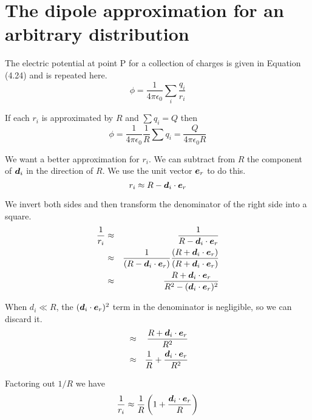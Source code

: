 \section{The dipole approximation for an arbitrary distribution}

The electric potential at point P for a collection of charges
is given in Equation (4.24) and is repeated here.
\begin{equation}
  \phi = \frac{1}{4\pi\epsilon_0} \sum_i \frac{q_i}{r_i}
\end{equation}

If each $r_i$ is approximated by $R$ and $\sum q_i=Q$ then
\begin{equation}
  \phi = \frac{1}{4\pi\epsilon_0} \frac{1}{R} \sum q_i = \frac{Q}{4\pi\epsilon_0 R}
\end{equation}

We want a better approximation for $r_i$.
We can subtract from $R$ the component of $\boldsymbol{d}_i$ in the direction of $R$.
We use the unit vector $\boldsymbol{e}_r$ to do this.
\begin{equation}
  r_i \approx R - \boldsymbol{d}_i \cdot \boldsymbol{e}_r
\end{equation}

We invert both sides and then transform the denominator
of the right side into a square.
\begin{eqnarray*}
  \frac{1}{r_i}
  &\approx& \frac{1}{R - \boldsymbol{d}_i \cdot \boldsymbol{e}_r} \\
  &\approx& \frac{1}{(R - \boldsymbol{d}_i \cdot \boldsymbol{e}_r)}
    \frac{(R + \boldsymbol{d}_i \cdot \boldsymbol{e}_r)}
	 {(R + \boldsymbol{d}_i \cdot \boldsymbol{e}_r)} \\
  &\approx& \frac{R + \boldsymbol{d}_i \cdot \boldsymbol{e}_r}
    {R^2 - (\boldsymbol{d}_i \cdot \boldsymbol{e}_r)^2}
\end{eqnarray*}

When $d_i \ll R$, the $(\boldsymbol{d}_i\cdot\boldsymbol{e}_r)^2$ term in the denominator is negligible,
so we can discard it.
\begin{eqnarray*}
  &\approx& \frac{R + \boldsymbol{d}_i \cdot \boldsymbol{e}_r}{R^2} \\
  &\approx& \frac{1}{R} + \frac{\boldsymbol{d}_i \cdot \boldsymbol{e}_r}{R^2}
\end{eqnarray*}

Factoring out $1/R$ we have
\begin{equation}
  \frac{1}{r_i} \approx \frac{1}{R} \left( 1 + \frac{\boldsymbol{d}_i \cdot \boldsymbol{e}_r}{R} \right)
\end{equation}

